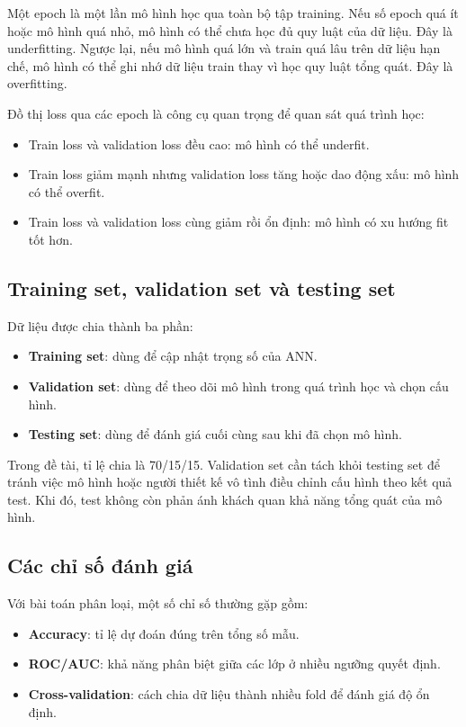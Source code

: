 \documentclass[12pt,a4paper]{article}
\begin{document}
Một epoch là một lần mô hình học qua toàn bộ tập training. Nếu số epoch quá ít hoặc mô hình quá nhỏ, mô hình có thể chưa học đủ quy luật của dữ liệu. Đây là underfitting. Ngược lại, nếu mô hình quá lớn và train quá lâu trên dữ liệu hạn chế, mô hình có thể ghi nhớ dữ liệu train thay vì học quy luật tổng quát. Đây là overfitting.

Đồ thị loss qua các epoch là công cụ quan trọng để quan sát quá trình học:

\begin{itemize}
    \item Train loss và validation loss đều cao: mô hình có thể underfit.
    \item Train loss giảm mạnh nhưng validation loss tăng hoặc dao động xấu: mô hình có thể overfit.
    \item Train loss và validation loss cùng giảm rồi ổn định: mô hình có xu hướng fit tốt hơn.
\end{itemize}

\subsection{Training set, validation set và testing set}

Dữ liệu được chia thành ba phần:

\begin{itemize}
    \item \textbf{Training set}: dùng để cập nhật trọng số của ANN.
    \item \textbf{Validation set}: dùng để theo dõi mô hình trong quá trình học và chọn cấu hình.
    \item \textbf{Testing set}: dùng để đánh giá cuối cùng sau khi đã chọn mô hình.
\end{itemize}

Trong đề tài, tỉ lệ chia là 70/15/15. Validation set cần tách khỏi testing set để tránh việc mô hình hoặc người thiết kế vô tình điều chỉnh cấu hình theo kết quả test. Khi đó, test không còn phản ánh khách quan khả năng tổng quát của mô hình.

\subsection{Các chỉ số đánh giá}

Với bài toán phân loại, một số chỉ số thường gặp gồm:

\begin{itemize}
    \item \textbf{Accuracy}: tỉ lệ dự đoán đúng trên tổng số mẫu.
    \item \textbf{ROC/AUC}: khả năng phân biệt giữa các lớp ở nhiều ngưỡng quyết định.
    \item \textbf{Cross-validation}: cách chia dữ liệu thành nhiều fold để đánh giá độ ổn định.
\end{itemize}
\end{document}
